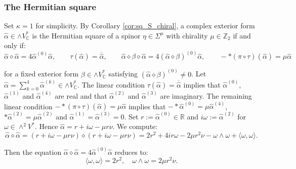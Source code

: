\documentclass[10pt,a4paper,twoside,reqno]{amsart}
\theoremstyle{plain}
\theoremstyle{definition}
\theoremstyle{remark}
\def\Z{\mathbb{Z}}
\def\C{\mathbb{C}}
\def\R{\mathbb{R}}
\def\R{\mathbb{R}}
\newcommand{\escal}[1]{\langle#1\rangle}
\begin{document}

\subsubsection{The Hermitian square}


Set $\kappa=1$ for simplicity. By Corollary \ref{cor:sq_S_chiral}, a complex exterior form $\widehat{\alpha}\in\wedge V^*_\C$ is the Hermitian square of a spinor $\eta \in \Sigma^{\mu}$ with chirality $\mu\in\Z_2$ if and only if: 
\begin{equation*}
\widehat{\alpha}\diamond\widehat{\alpha}=4\widehat{\alpha}^{(0)}\widehat{\alpha}, \qquad \tau(\widehat{\alpha}) = \overline{\widehat{\alpha}}, \qquad \widehat{\alpha} \diamond \beta \diamond \widehat{\alpha} = 4 (\widehat{\alpha}\diamond\beta)^{(0)} \widehat{\alpha},\qquad -*(\pi\circ\tau)(\widehat{\alpha})=\mu\widehat{\alpha}
\end{equation*}

\noindent
for a fixed exterior form $\beta\in\wedge V^*_\C$ satisfying $(\widehat{\alpha}\diamond\beta)^{(0)}\neq0$. Let $\widehat{\alpha}=\sum_{k=0}^4\widehat{\alpha}^{(k)}\in\wedge V^*_\C$. The linear condition $\tau(\widehat{\alpha}) = \overline{\widehat{\alpha}}$ implies that $\widehat{\alpha}^{(0)}$, $\widehat{\alpha}^{(1)}$ and $\widehat{\alpha}^{(4)}$ are real and that $\widehat{\alpha}^{(2)}$ and $\widehat{\alpha}^{(3)}$ are imaginary. The remaining linear condition $-*(\pi\circ\tau)(\widehat{\alpha})=\mu\widehat{\alpha}$ implies that $-*\widehat{\alpha}^{(0)}=\mu\widehat{\alpha}^{(4)}$, $*\widehat{\alpha}^{(2)}=\mu\widehat{\alpha}^{(2)}$ and $\widehat{\alpha}^{(1)}=\widehat{\alpha}^{(3)}=0$. Set $r:=\widehat{\alpha}^{(0)}\in\R$ and $i\omega:=\widehat{\alpha}^{(2)}$ for $\omega\in\wedge^2V^*$. Hence $\widehat{\alpha}=r+i\omega-\mu r\nu$. We compute: 
\begin{equation*}
 \widehat{\alpha}\diamond\widehat{\alpha}=(r+i\omega-\mu r\nu)\diamond(r+i\omega-\mu r\nu)=2r^2+4ir\omega-2\mu r^2\nu-\omega\wedge\omega+\escal{\omega,\omega}.  
\end{equation*}

\noindent
Then the equation $\widehat{\alpha}\diamond\widehat{\alpha}=4\widehat{\alpha}^{(0)}\widehat{\alpha}$ reduces to:
\begin{equation*}
 \escal{\omega,\omega}=2r^2,\quad\omega\wedge\omega=2\mu r^2\nu.   
\end{equation*}
\end{document}
